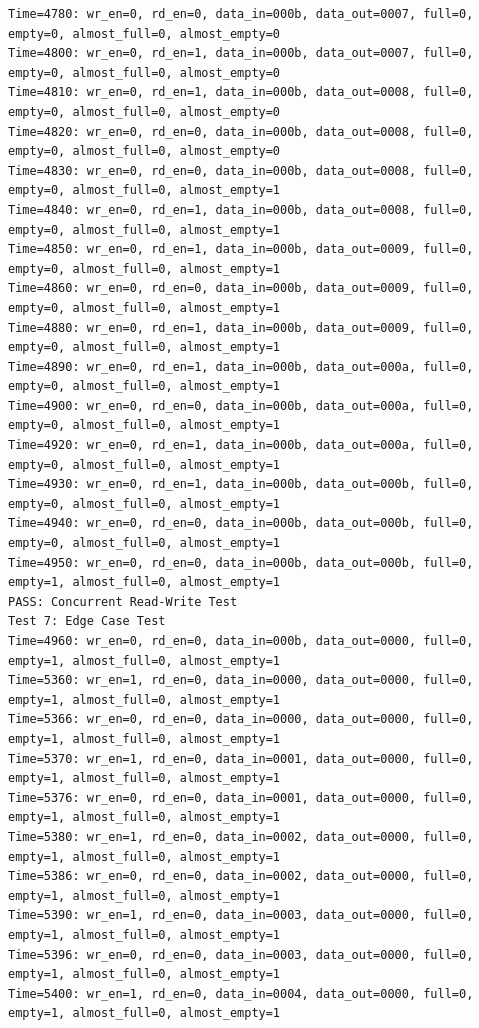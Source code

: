 \documentclass[UTF8]{ctexart}
\begin{document}
\begin{lstlisting}[frame=shadowbox]
Time=4780: wr_en=0, rd_en=0, data_in=000b, data_out=0007, full=0, empty=0, almost_full=0, almost_empty=0
Time=4800: wr_en=0, rd_en=1, data_in=000b, data_out=0007, full=0, empty=0, almost_full=0, almost_empty=0
Time=4810: wr_en=0, rd_en=1, data_in=000b, data_out=0008, full=0, empty=0, almost_full=0, almost_empty=0
Time=4820: wr_en=0, rd_en=0, data_in=000b, data_out=0008, full=0, empty=0, almost_full=0, almost_empty=0
Time=4830: wr_en=0, rd_en=0, data_in=000b, data_out=0008, full=0, empty=0, almost_full=0, almost_empty=1
Time=4840: wr_en=0, rd_en=1, data_in=000b, data_out=0008, full=0, empty=0, almost_full=0, almost_empty=1
Time=4850: wr_en=0, rd_en=1, data_in=000b, data_out=0009, full=0, empty=0, almost_full=0, almost_empty=1
Time=4860: wr_en=0, rd_en=0, data_in=000b, data_out=0009, full=0, empty=0, almost_full=0, almost_empty=1
Time=4880: wr_en=0, rd_en=1, data_in=000b, data_out=0009, full=0, empty=0, almost_full=0, almost_empty=1
Time=4890: wr_en=0, rd_en=1, data_in=000b, data_out=000a, full=0, empty=0, almost_full=0, almost_empty=1
Time=4900: wr_en=0, rd_en=0, data_in=000b, data_out=000a, full=0, empty=0, almost_full=0, almost_empty=1
Time=4920: wr_en=0, rd_en=1, data_in=000b, data_out=000a, full=0, empty=0, almost_full=0, almost_empty=1
Time=4930: wr_en=0, rd_en=1, data_in=000b, data_out=000b, full=0, empty=0, almost_full=0, almost_empty=1
Time=4940: wr_en=0, rd_en=0, data_in=000b, data_out=000b, full=0, empty=0, almost_full=0, almost_empty=1
Time=4950: wr_en=0, rd_en=0, data_in=000b, data_out=000b, full=0, empty=1, almost_full=0, almost_empty=1
PASS: Concurrent Read-Write Test
Test 7: Edge Case Test
Time=4960: wr_en=0, rd_en=0, data_in=000b, data_out=0000, full=0, empty=1, almost_full=0, almost_empty=1
Time=5360: wr_en=1, rd_en=0, data_in=0000, data_out=0000, full=0, empty=1, almost_full=0, almost_empty=1
Time=5366: wr_en=0, rd_en=0, data_in=0000, data_out=0000, full=0, empty=1, almost_full=0, almost_empty=1
Time=5370: wr_en=1, rd_en=0, data_in=0001, data_out=0000, full=0, empty=1, almost_full=0, almost_empty=1
Time=5376: wr_en=0, rd_en=0, data_in=0001, data_out=0000, full=0, empty=1, almost_full=0, almost_empty=1
Time=5380: wr_en=1, rd_en=0, data_in=0002, data_out=0000, full=0, empty=1, almost_full=0, almost_empty=1
Time=5386: wr_en=0, rd_en=0, data_in=0002, data_out=0000, full=0, empty=1, almost_full=0, almost_empty=1
Time=5390: wr_en=1, rd_en=0, data_in=0003, data_out=0000, full=0, empty=1, almost_full=0, almost_empty=1
Time=5396: wr_en=0, rd_en=0, data_in=0003, data_out=0000, full=0, empty=1, almost_full=0, almost_empty=1
Time=5400: wr_en=1, rd_en=0, data_in=0004, data_out=0000, full=0, empty=1, almost_full=0, almost_empty=1

\end{lstlisting}
\end{document}
